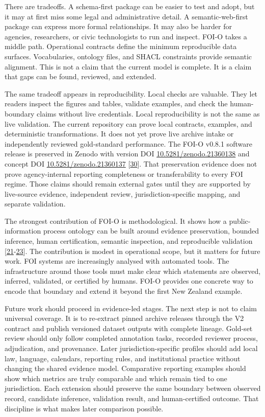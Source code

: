 \documentclass[
]{article}
\begin{document}
There are tradeoffs. A schema-first package can be easier to test and
adopt, but it may at first miss some legal and administrative detail. A
semantic-web-first package can express more formal relationships. It may
also be harder for agencies, researchers, or civic technologists to run
and inspect. FOI-O takes a middle path. Operational contracts define the
minimum reproducible data surfaces. Vocabularies, ontology files, and
SHACL constraints provide semantic alignment. This is not a claim that
the current model is complete. It is a claim that gaps can be found,
reviewed, and extended.

The same tradeoff appears in reproducibility. Local checks are valuable.
They let readers inspect the figures and tables, validate examples, and
check the human-boundary claims without live credentials. Local
reproducibility is not the same as live validation. The current
repository can prove local contracts, examples, and deterministic
transformations. It does not yet prove live archive intake or
independently reviewed gold-standard performance. The FOI-O v0.8.1
software release is preserved in Zenodo with version DOI
\href{https://doi.org/10.5281/zenodo.21360138}{10.5281/zenodo.21360138}
and concept DOI
\href{https://doi.org/10.5281/zenodo.21360137}{10.5281/zenodo.21360137}
{[}\hyperlink{ref-30}{30}{]}. That preservation evidence does not prove agency-internal
reporting completeness or transferability to every FOI regime. Those
claims should remain external gates until they are supported by
live-source evidence, independent review, jurisdiction-specific mapping,
and separate validation.

The strongest contribution of FOI-O is methodological. It shows how a
public-information process ontology can be built around evidence
preservation, bounded inference, human certification, semantic
inspection, and reproducible validation {[}\hyperlink{ref-21}{21}-\hyperlink{ref-23}{23}{]}. The contribution is
modest in operational scope, but it matters for future work. FOI systems
are increasingly analysed with automated tools. The infrastructure
around those tools must make clear which statements are observed,
inferred, validated, or certified by humans. FOI-O provides one concrete
way to encode that boundary and extend it beyond the first New Zealand
example.

Future work should proceed in evidence-led stages. The next step is not
to claim universal coverage. It is to re-extract pinned archive releases
through the V2 contract and publish versioned dataset outputs with
complete lineage. Gold-set review should only follow completed
annotation tasks, recorded reviewer process, adjudication, and
provenance. Later jurisdiction-specific profiles should add local law,
language, calendars, reporting rules, and institutional practice without
changing the shared evidence model. Comparative reporting examples
should show which metrics are truly comparable and which remain tied to
one jurisdiction. Each extension should preserve the same boundary
between observed record, candidate inference, validation result, and
human-certified outcome. That discipline is what makes later comparison
possible.
\end{document}
